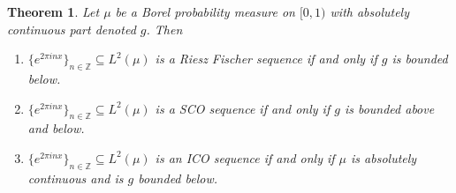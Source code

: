 \documentclass[11pt]{amsart}
\newtheorem{thm}{Theorem}[section]
\theoremstyle{definition}
\numberwithin{equation}{section}
\begin{document}
\begin{thm}
Let $\mu$ be a Borel probability measure on $[0,1)$ with absolutely continuous part denoted $g$. Then 
\begin{enumerate}
    \item $\{e^{2\pi i nx}\}_{n\in \mathbb{Z}}\subseteq L^2(\mu)$ is a Riesz Fischer sequence if and only if $g$ is bounded below.
    \item $\{e^{2\pi i nx}\}_{n\in \mathbb{Z}}\subseteq L^2(\mu)$ is a SCO sequence if and only if $g$ is bounded above and below.
   \item $\{e^{2\pi i nx}\}_{n\in \mathbb{Z}}\subseteq L^2(\mu)$ is an ICO sequence if and only if $\mu$ is absolutely continuous and is $g$ bounded below.
\end{enumerate}


\end{thm}
\end{document}
